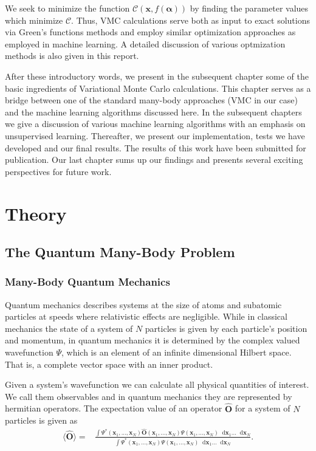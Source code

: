 \documentclass[twoside,english]{uiofysmaster}
\newcommand*\dif{\mathop{}\!\mathrm{d}}
\begin{document}
We seek to minimize the function $\mathcal{C} (\mathbf{x},
f(\mathbf{\alpha}))$ by finding the parameter values which minimize
$\mathcal{C}$. Thus, VMC calculations serve both as input to exact
solutions via Green's functions methods and employ similar
optimization approaches as employed in machine learning.  A detailed discussion 
of various optmization methods is also given in this report.

After these introductory words, we present in the subsequent chapter some of the basic ingredients of 
Variational Monte Carlo calculations. This chapter serves as a bridge between one of the standard many-body approaches (VMC in our case) and the machine learning algorithms discussed here. In the subsequent chapters we give a discussion of various machine learning algorithms with an emphasis on unsupervised learning. 
Thereafter, we present our implementation, tests we have developed and our final results. The results of this 
work have been submitted for publication.
Our last chapter sums up our findings and presents several exciting perspectives for future work. 


\part{Theory}

\chapter{The Quantum Many-Body Problem}

\section{Many-Body Quantum Mechanics}
Quantum mechanics describes systems at the size of atoms and subatomic
particles at speeds where relativistic effects are negligible. While
in classical mechanics the state of a system of $N$ particles is given
by each particle's position and momentum, in quantum mechanics it is
determined by the complex valued wavefunction $\Psi$, which is an
element of an infinite dimensional Hilbert space. That is, a complete
vector space with an inner product.\cite{Kvaal2017}

Given a system's wavefunction we can calculate all physical quantities
of interest\cite{Kvaal2017}. We call them observables and in quantum
mechanics they are represented by hermitian operators.  The
expectation value of an operator $\hat{\bm{O}}$ for a system of $N$
particles is given as \cite{HjortJensen2015}
\begin{align}
	\langle \hat{\bm{O}} \rangle =& \frac{\int \Psi^{\ast}(\bm{x}_1,...,\bm{x}_N) \hat{\bm{O}}(\bm{x}_1,...,\bm{x}_N)
	\Psi (\bm{x}_1,...,\bm{x}_N)
	\dif \bm{x}_1 ... \dif \bm{x}_N  }
	{\int \Psi^{\ast}(\bm{x}_1,...,\bm{x}_N)
	\Psi (\bm{x}_1,...,\bm{x}_N)
	\dif \bm{x}_1 ... \dif \bm{x}_N}.
\end{align}
\end{document}
